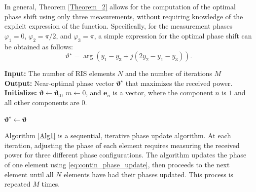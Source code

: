 \documentclass[conference]{IEEEtran}
\begin{document}
In general, Theorem \ref{Theorem_2} allows for the computation of the optimal phase shift using only three measurements, without requiring knowledge of the explicit expression of the function. 
Specifically, for the measurement phases $\varphi_{1}=0$, $\varphi_{2}=\pi/2$, and $\varphi_{3}=\pi$, a simple expression for the optimal phase shift can be obtained as follows:
\begin{equation}\label{eq:contin_phase_update}
\vartheta^{\star}=\arg{\left(y_{1}-y_{3}+j\left(2y_{2}-y_{1}-y_{3}\right)\right)}.
\end{equation}
\begin{algorithm}[t!] \label{Alg1}
\caption{The proposed phase-alignment algorithm for power maximization}
\textbf{Input:} The number of RIS elements $N$ and the number of iterations $M$\\
\textbf{Output:} Near-optimal phase vector $\bm{\vartheta}^{\star}$ that maximizes the received power.\\
\textbf{Initialize:} $\bm{\vartheta}\gets \bm{\vartheta}_{0}$, $m\gets 0$, and $\bm{e}_{n}$ is a vector, where the component $n$ is $1$ and all other components are $0$. 

$\bm{\vartheta}^{\star}\gets \bm{\vartheta}$\;
\end{algorithm}

Algorithm \ref{Alg1} is a sequential, iterative phase update algorithm. At each iteration, adjusting the phase of each element requires measuring the received power for three different phase configurations. The algorithm updates the phase of one element using \eqref{eq:contin_phase_update}, then proceeds to the next element until all $N$ elements have had their phases updated. This process is repeated $M$ times. 
\end{document}
